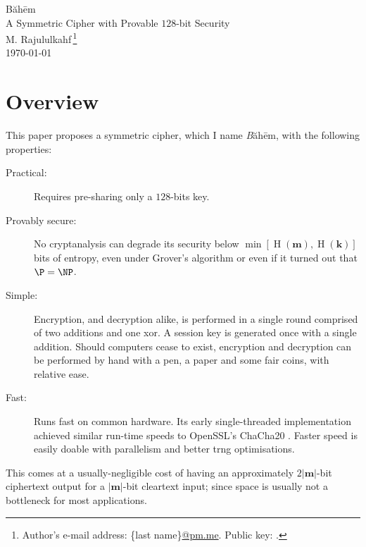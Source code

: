 \documentclass[twocolumn,hidelinks]{article}
\newcommand{\baheem}{Băhēm}
\DeclareMathOperator{\entropy}{H}
\begin{document}
\begin{center}
    \Huge
    \baheem\\
    \LARGE
    A Symmetric Cipher with Provable $128$-bit Security\\
    \normalsize
    \vspace{0.5em}
    M. Rajululkahf\,\footnote{Author's
    e-mail address: \{last name\}\url{@pm.me}.  Public key: .}\\
    \vspace{0.5em}
    \footnotesize
    \today
\end{center}

\section*{Overview}
This paper proposes a symmetric cipher, which I name \emph\baheem, with the
following properties:
\begin{description}
    \item[Practical:]  Requires pre-sharing only a $128$-bits key.

    \item[Provably secure:]  No cryptanalysis can degrade its security
        below $\min[\entropy(\mathbf{m}), \entropy(\mathbf{k})]$ bits of
        entropy, even under Grover's algorithm \cite{10.1145/237814.237866}
        or even if it turned out that $\P = \NP$.

    \item[Simple:]  Encryption, and decryption alike, is performed in a
        single round comprised of two additions and one \gls{xor}.  A
        session key is generated once with a single addition. Should
        computers cease to exist, encryption and decryption can be
        performed by hand with a pen, a paper and some fair coins, with
        relative ease.

    \item[Fast:]  Runs fast on common hardware.  Its early single-threaded
        implementation achieved similar run-time speeds to OpenSSL's
        ChaCha20 \cite{chacha20}. Faster speed is easily doable with
        parallelism and better \gls{trng} optimisations.
\end{description}

This comes at a usually-negligible cost of having an approximately
$2|\mathbf{m}|$-bit ciphertext output for a $|\mathbf{m}|$-bit cleartext
input; since space is usually not a bottleneck for most applications. 
\end{document}

